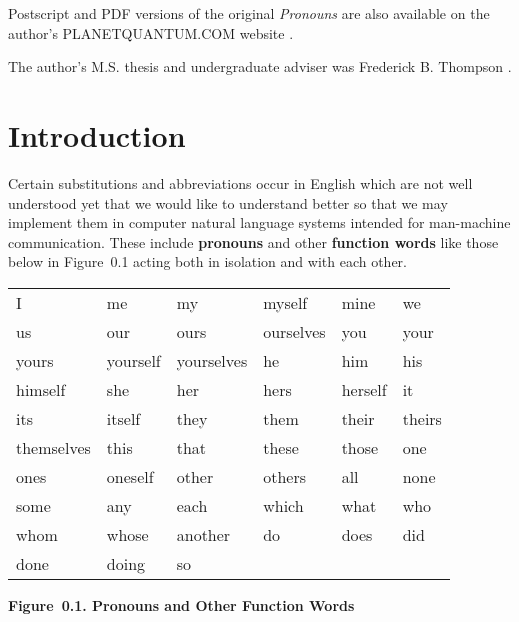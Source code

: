 \documentclass{article}
\begin{document}
Postscript and PDF versions of the original \textit{Pronouns}
are also available on the author's PLANETQUANTUM.COM
website \cite{PronounsAtPlanetQuantum}.

The author's M.S. thesis and undergraduate adviser was
Frederick B. Thompson \cite{FredThompson}.

%
%

\clearpage

\section*{Introduction}

Certain substitutions and abbreviations occur in English which
are not well understood yet that we would like to understand
better so that we may implement them in computer natural
language systems intended for man-machine communication. These
include  \textbf{pronouns} and other
 \textbf{function words} like those below
in Figure~0.1 acting both in isolation and with each other.

\goodbreak
\bigbreak
\begin{table}[h!]
\centering
\begin{tabular}{llllll}
I & me & my & myself & mine & we \\
us & our & ours & ourselves & you & your \\
yours & yourself & yourselves & he & him & his \\
himself & she & her & hers & herself & it \\
its & itself & they & them & their & theirs \\
themselves & this & that & these & those & one \\
ones & oneself & other & others & all & none \\
some & any & each & which & what & who \\
whom & whose & another & do & does & did \\
done & doing & so & & & \\
\end{tabular}
\end{table}
\textbf{Figure~0.1. Pronouns and Other Function Words}
\bigbreak
\end{document}
